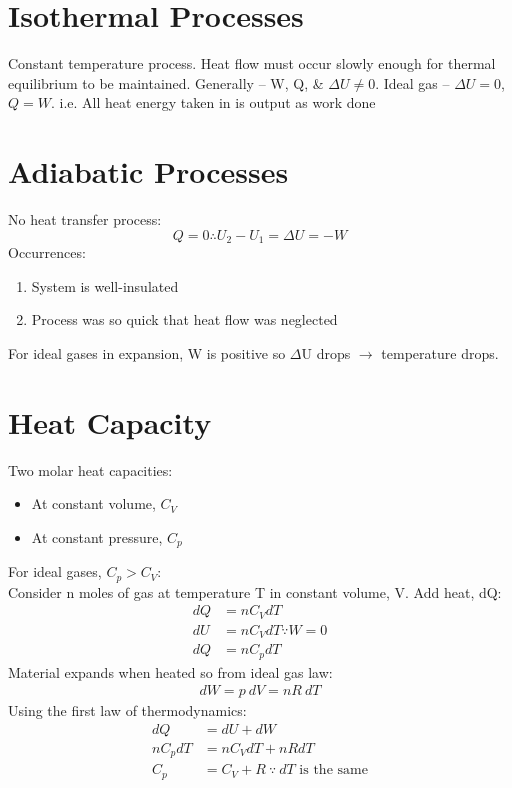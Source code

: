 \documentclass[a4paper, 11pt, normalem]{report}
\begin{document}
\section{Isothermal Processes}
Constant temperature process.
Heat flow must occur slowly enough for thermal equilibrium to be maintained.
Generally -- W, Q, \& ${\Delta}U \neq 0$.
Ideal gas -- ${\Delta}U = 0$, $Q = W$.
i.e. All heat energy taken in is output as work done

\section{Adiabatic Processes}
No heat transfer process:
\begin{equation}
	Q = 0 \therefore U_{2} - U_{1} = {\Delta}U = -W
\end{equation}
Occurrences:
\begin{enumerate}
	\item System is well-insulated
	\item Process was so quick that heat flow was neglected
\end{enumerate}
For ideal gases in expansion, W is positive so $\Delta$U drops $\rightarrow$ temperature drops.

\section{Heat Capacity}
Two molar heat capacities:
\begin{itemize}
	\item At constant volume, $C_{V}$
	\item At constant pressure, $C_{p}$
\end{itemize}
For ideal gases, $C_{p} > C_{V}$:\\
Consider n moles of gas at temperature T in constant volume, V.
Add heat, dQ:
\begin{align}
    dQ &= nC_{V}dT \\
    dU &= nC_{V}dT \because W = 0 \\
    dQ &= nC_{p}dT
\end{align}
Material expands when heated so from ideal gas law:
\begin{align}
	dW = p\:dV = nR\:dT
\end{align}
Using the first law of thermodynamics:
\begin{align}
    dQ &= dU + dW \\
    nC_{p}dT &= nC_{V}dT + nRdT \\
    C_{p} &= C_{V} + R ~\because~ dT \text{ is the same}
\end{align}
\end{document}

